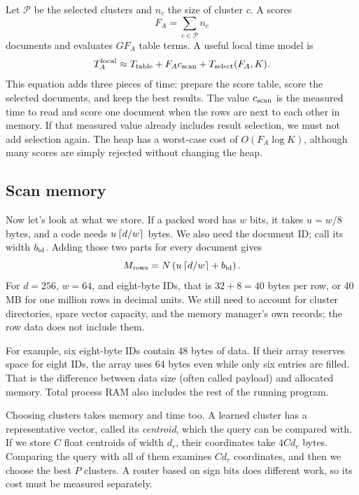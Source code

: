 Let $\mathcal P$ be the selected clusters and $n_c$ the size of cluster $c$. A scores
\[
F_A=\sum_{c\in\mathcal P}n_c
\]
documents and evaluates $G F_A$ table terms. A useful local time model is
\begin{equation}
T_A^{\rm local}\approx T_{\rm table}+F_Ac_{\rm scan}+T_{\rm select}(F_A,K).
\label{eq:scan-time}
\end{equation}
This equation adds three pieces of time: prepare the score table, score the selected documents,
and keep the best results. The value $c_{\rm scan}$ is the measured time to read and score
one document when the rows are next to each other in memory. If that measured value already
includes result selection, we must not add selection again. The heap has a worst-case cost
of $O(F_A\log K)$, although many scores are simply rejected without changing the heap.

\subsection{Scan memory}
Now let's look at what we store. If a packed word has $w$ bits, it takes $u=w/8$ bytes, and
a code needs $u\left\lceil d/w\right\rceil$ bytes. We also need the document ID; call its width $b_{\rm id}$.
Adding those two parts for every document gives
\begin{equation}
M_{\rm rows}=N\left(u\left\lceil d/w\right\rceil+b_{\rm id}\right).
\label{eq:rows}
\end{equation}
For $d=256$, $w=64$, and eight-byte IDs, that is $32+8=40$ bytes per row, or 40 MB for one
million rows in decimal units. We still need to account for cluster directories, spare vector
capacity, and the memory manager's own records; the row data does not include them.

For example, six eight-byte IDs contain 48 bytes of data. If their array reserves space for
eight IDs, the array uses 64 bytes even while only six entries are filled. That is the difference
between data size (often called payload) and allocated memory. Total process RAM also includes
the rest of the running program.

Choosing clusters takes memory and time too. A learned cluster has a representative vector,
called its \emph{centroid}, which the query can be compared with. If we store $C$ float
centroids of width $d_r$, their coordinates take $4Cd_r$ bytes. Comparing the query with all
of them examines $Cd_r$ coordinates, and then we choose the best $P$ clusters. A router based
on sign bits does different work, so its cost must be measured separately.

